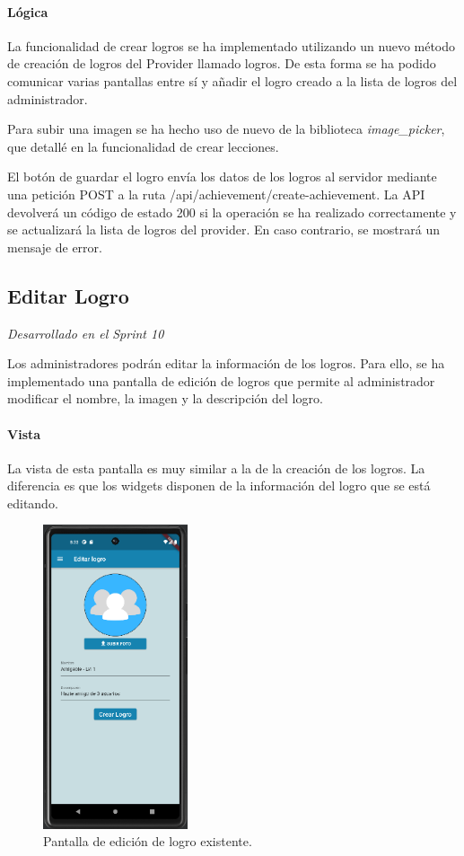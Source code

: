 \paragraph*{Lógica}
La funcionalidad de crear logros se ha implementado utilizando un nuevo método de creación de logros del Provider llamado logros. De esta forma
se ha podido comunicar varias pantallas entre sí y añadir el logro creado a la lista de logros del administrador.


Para subir una imagen se ha hecho uso de nuevo de la biblioteca \textit{image\_picker}, que detallé en la funcionalidad de crear lecciones.

El botón de guardar el logro envía los datos de los logros al servidor mediante una petición POST a la ruta /api/achievement/create-achievement. La API devolverá un código de estado 200 si la operación se ha realizado correctamente y se actualizará la lista de logros del provider. En caso contrario, se mostrará un mensaje de error.


\subsection{Editar Logro} 

\textit{Desarrollado en el Sprint 10}

Los administradores podrán editar la información de los logros. Para ello, se ha implementado una pantalla de edición de logros que permite al administrador modificar el nombre, la imagen y la descripción del logro.

\paragraph*{Vista}
La vista de esta pantalla es muy similar a la de la creación de los logros. La diferencia es que los widgets disponen de la información del logro que se está editando.

\begin{figure}[H]
  \centering
  \includegraphics[width=0.38\textwidth]{imagenes/c7/editarlogro.png}
  \caption{Pantalla de edición de logro existente.} 
  \label{fig:edicion_logro}
\end{figure}


